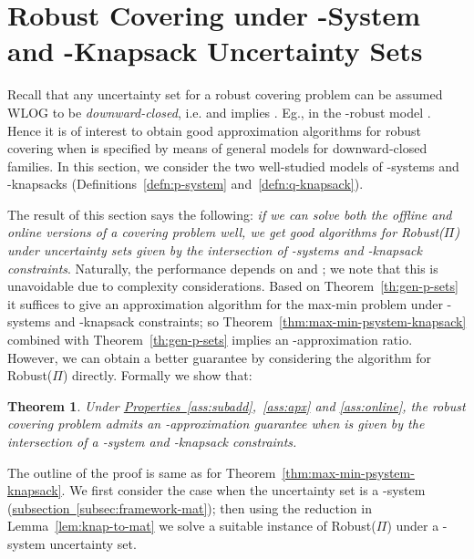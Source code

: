 \documentclass[11pt,letterpaper]{article}
\newcommand{\ignore}[1]{}
\newcommand{\lref}[2][]{\hyperref[#2]{#1~\ref*{#2}}}
\newtheorem{theorem}{Theorem}[section]
\def\cov{\ensuremath{\Pi}\xspace}
\def\rcov{{\sf Robust(\cov)}\xspace}
\newcounter{note}[section]
\begin{document}
\section{Robust Covering under -System and -Knapsack Uncertainty
  Sets}
\label{sec:combine}

Recall that any uncertainty set  for a robust covering problem can be assumed WLOG to be {\em downward-closed},
i.e.  and  implies . Eg., in the -robust model .
Hence it is of interest to obtain good approximation algorithms for robust covering when  is specified by means
of general models for downward-closed families. In this section, we consider the two well-studied models of -systems
and -knapsacks (Definitions~\ref{defn:p-system} and~\ref{defn:q-knapsack}).

\ignore{In this section, we consider robust covering problems under uncertainty sets described via -systems and
knapsack constraints. Recall the framework defined in \lref[Section]{sec:notation}: we have a covering problem \cov
with  requirements, and the possible second-stage scenarios are given by some downward-closed .
Here we consider uncertainty sets specified by means of the following two well-studied models for downward-closed
families.}

The result of this section says the following: \emph{if we can solve
  both the offline and online versions of a covering problem well, we
  get good algorithms for \rcov under uncertainty sets given by the
  intersection of -systems and -knapsack constraints}. Naturally, the
performance depends on  and ; we note  that this is unavoidable due to complexity considerations. Based on
Theorem~\ref{th:gen-p-sets} it suffices to give an approximation algorithm for the max-min problem under -systems
and -knapsack constraints; so Theorem~\ref{thm:max-min-psystem-knapsack} combined with Theorem~\ref{th:gen-p-sets}
implies an -approximation ratio. However, we can obtain a better
guarantee by considering the algorithm for \rcov directly. Formally we show that:
\begin{theorem}\label{th:general}
  Under \lref[Properties]{ass:subadd},~\ref{ass:apx} and
  \ref{ass:online}, the robust covering problem  admits an -approximation
  guarantee when  is given by the intersection of a -system and -knapsack constraints.
\end{theorem}
The outline of the proof is same as for Theorem~\ref{thm:max-min-psystem-knapsack}. We first consider the case when the
uncertainty set is a -system (\lref[subsection]{subsec:framework-mat}); then using the reduction in
Lemma~\ref{lem:knap-to-mat} we solve a suitable instance of \rcov under a -system uncertainty set.
\end{document}
